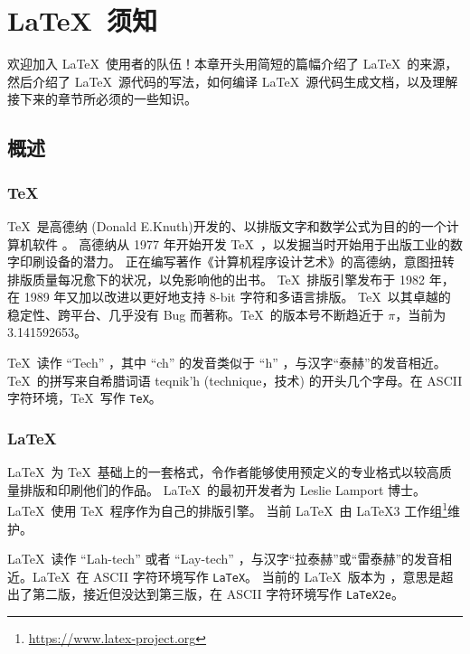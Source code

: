 \chapter{\LaTeX\ 须知}\label{chap:basics}

\begin{intro}
欢迎加入 \LaTeX\ 使用者的队伍！本章开头用简短的篇幅介绍了 \LaTeX\ 的来源，
然后介绍了 \LaTeX\ 源代码的写法，如何编译 \LaTeX\ 源代码生成文档，以及理解接下来的章节所必须的一些知识。
\end{intro}

\section{概述}\label{sec:intro}

\subsection{\protect\TeX}\label{subsec:tex}

\TeX\ 是高德纳 (Donald E.Knuth)开发的、以排版文字和数学公式为目的的一个计算机软件 \cite{texbook}。
高德纳从 1977 年开始开发 \TeX\ ，以发掘当时开始用于出版工业的数字印刷设备的潜力。
正在编写著作《计算机程序设计艺术》的高德纳，意图扭转排版质量每况愈下的状况，以免影响他的出书。
\TeX\ 排版引擎发布于 1982 年，在 1989 年又加以改进以更好地支持 8-bit 字符和多语言排版。
\TeX\ 以其卓越的稳定性、跨平台、几乎没有 Bug 而著称。\TeX\ 的版本号不断趋近于 $\pi$，当前为 3.141592653。

\TeX\ 读作 ``Tech'' ，其中 ``ch'' 的发音类似于 ``h'' ，与汉字“泰赫”的发音相近。\TeX\ 的拼写来自希腊词语
{\selectfont teqnik'h} (technique，技术) 的开头几个字母。在 ASCII 字符环境，\TeX\ 写作 \texttt{TeX}。

\subsection{\LaTeX}\label{subsec:latex}

\LaTeX\ 为 \TeX\ 基础上的一套格式，令作者能够使用预定义的专业格式以较高质量排版和印刷他们的作品。
\LaTeX\ 的最初开发者为 Leslie Lamport 博士\cite{manual}。\LaTeX\ 使用 \TeX\ 程序作为自己的排版引擎。
当前 \LaTeX\ 由 \LaTeX 3 工作组\footnote{\url{https://www.latex-project.org}}维护。

\LaTeX\ 读作 ``Lah-tech'' 或者 ``Lay-tech'' ，与汉字“拉泰赫”或“雷泰赫”的发音相近。\LaTeX\ 在 ASCII 字符环境写作 \texttt{LaTeX}。
当前的 \LaTeX\ 版本为 \LaTeXe ，意思是超出了第二版，接近但没达到第三版，在 ASCII 字符环境写作 \texttt{LaTeX2e}。

